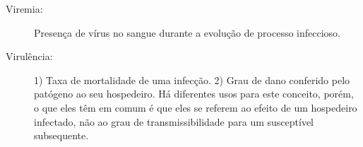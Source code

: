 \begin{description}
\item[Viremia:] Presença de vírus no sangue durante a evolução de processo infeccioso.

\item[Virulência:] 1) Taxa de mortalidade de uma infecção. 2) Grau de dano conferido pelo patógeno ao seu hospedeiro. Há diferentes usos para este conceito, porém, o que eles têm em comum é que eles se referem ao efeito de um hospedeiro infectado, não ao grau de transmissibilidade para um susceptível subsequente.

\end{description} 